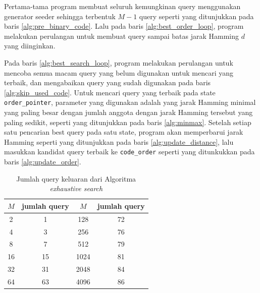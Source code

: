Pertama-tama program membuat seluruh kemungkinan query menggunakan generator seeder sehingga terbentuk $M-1$ query seperti yang ditunjukkan pada baris \ref{alg:pre_binary_code}. Lalu pada baris \ref{alg:best_order_loop}, program melakukan perulangan untuk membuat query sampai batas jarak Hamming $d$ yang diinginkan. 

Pada baris \ref{alg:best_search_loop}, program melakukan perulangan untuk mencoba semua macam query yang belum digunakan untuk mencari yang terbaik, dan mengabaikan query yang sudah digunakan pada baris \ref{alg:skip_used_code}. Untuk mencari query yang terbaik pada state \texttt{order\_pointer}, parameter yang digunakan adalah yang jarak Hamming minimal yang paling besar dengan jumlah anggota dengan jarak Hamming tersebut yang paling sedikit, seperti yang ditunjukkan pada baris \ref{alg:minmax}. Setelah setiap satu pencarian best query pada satu state, program akan memperbarui jarak Hamming seperti yang ditunjukkan pada baris \ref{alg:update_distance}, lalu masukkan kandidat query terbaik ke \texttt{code\_order} seperti yang ditunkukkan pada baris \ref{alg:update_order}.

\begin{table}[h!]
\caption{Jumlah query keluaran dari Algoritma \textit{exhaustive search}}
\label{tab:query_count}
\begin{center}
\begin{tabular}{|c|c|c|c|}
\hline
$M$ & jumlah query & $M$ & jumlah query \\
\hline
2 & 1 & 128 & 72 \\
\hline
4 & 3 & 256 & 76 \\
\hline
8 & 7 & 512 & 79 \\
\hline
16 & 15 & 1024 & 81 \\
\hline
32 & 31 & 2048 & 84 \\
\hline
64 & 63 & 4096 & 86 \\
\hline
\end{tabular}
\end{center}
\end{table}

